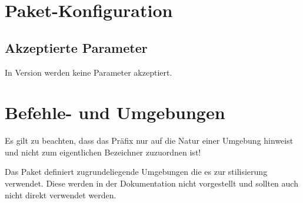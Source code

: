 \documentclass{sopra-base}
\begin{document}
\section{Paket-Konfiguration}    
    \subsection{Akzeptierte Parameter}
    In Version \thesosversion{} werden keine Parameter akzeptiert.

%
%
%
%

\section{Befehle- und Umgebungen}

Es gilt zu beachten, dass das Präfix  nur auf die Natur einer Umgebung hinweist und nicht zum eigentlichen Bezeichner zuzuordnen ist!\par{}
Das Paket definiert zugrundeliegende Umgebungen die es zur stilisierung verwendet.
Diese werden in der Dokumentation nicht vorgestellt und sollten auch nicht direkt
verwendet werden.
\end{document}
